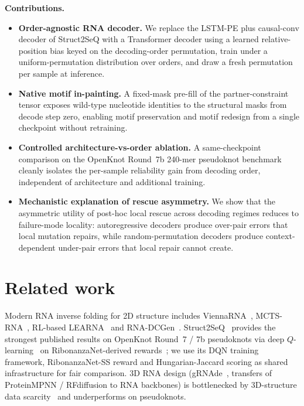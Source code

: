 \documentclass{article}
\begin{document}
\noindent\textbf{Contributions.}
\begin{itemize}\itemsep0pt
  \item \textbf{Order-agnostic RNA decoder.} We replace the LSTM-PE
        plus causal-conv decoder of Struct2SeQ with a Transformer
        decoder using a learned relative-position bias keyed on the
        decoding-order permutation, train under a uniform-permutation
        distribution over orders, and draw a fresh permutation per
        sample at inference.
  \item \textbf{Native motif in-painting.} A fixed-mask pre-fill of
        the partner-constraint tensor exposes wild-type nucleotide
        identities to the structural masks from decode step zero,
        enabling motif preservation and motif redesign from a single
        checkpoint without retraining.
  \item \textbf{Controlled architecture-vs-order ablation.} A
        same-checkpoint comparison on the OpenKnot Round~7b 240-mer
        pseudoknot benchmark cleanly isolates the per-sample
        reliability gain from decoding order, independent of
        architecture and additional training.
  \item \textbf{Mechanistic explanation of rescue asymmetry.} We
        show that the asymmetric utility of post-hoc local rescue
        across decoding regimes reduces to failure-mode locality:
        autoregressive decoders produce over-pair errors that local
        mutation repairs, while random-permutation decoders produce
        context-dependent under-pair errors that local repair cannot
        create.
\end{itemize}

\section{Related work}
\label{sec:related}

Modern RNA inverse folding for 2D structure includes
ViennaRNA~\citep{lorenz2011viennarna},
MCTS-RNA~\citep{yang2017mctsrna}, RL-based
LEARNA~\citep{runge2019learna} and RNA-DCGen~\citep{rnadcgen2024}.
Struct2SeQ~\citep{he2026struct2seq} provides the strongest published
results on OpenKnot Round~7 / 7b pseudoknots via deep
$Q$-learning~\citep{mnih2015dqn,sutton2018rl} on RibonanzaNet-derived
rewards~\citep{he2024ribonanza}; we use its DQN training framework,
RibonanzaNet-SS reward and Hungarian-Jaccard scoring as shared
infrastructure for fair comparison. 3D RNA design
(gRNAde~\citep{joshi2024grnade}, transfers of ProteinMPNN /
RFdiffusion to RNA backbones) is bottlenecked by 3D-structure data
scarcity~\citep{townshend2021atomicnet} and underperforms on
pseudoknots.
\end{document}
